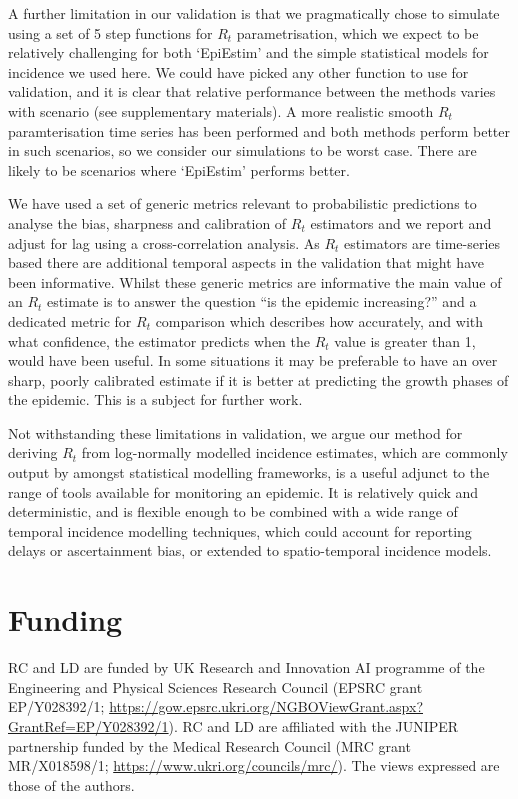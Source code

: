 \documentclass[10pt,letterpaper]{article}
\begin{document}
A further limitation in our validation is that we pragmatically chose to simulate using a set of 5 step functions for $R_t$ parametrisation, which we expect to be relatively challenging for both `EpiEstim' and the simple statistical models for incidence we used here. We could have picked any other function to use for validation, and it is clear that relative performance between the methods varies with scenario (see supplementary materials). A more realistic smooth $R_t$ paramterisation time series has been performed and both methods perform better in such scenarios, so we consider our simulations to be worst case. There are likely to be scenarios where `EpiEstim' performs better.

We have used a set of generic metrics relevant to probabilistic predictions to analyse the bias, sharpness and calibration of $R_t$ estimators and we report and adjust for lag using a cross-correlation analysis. As $R_t$ estimators are time-series based there are additional temporal aspects in the validation that might have been informative. Whilst these generic metrics are informative the main value of an $R_t$ estimate is to answer the question ``is the epidemic increasing?'' and a dedicated metric for $R_t$ comparison which describes how accurately, and with what confidence, the estimator predicts when the $R_t$ value is greater than 1, would have been useful. In some situations it may be preferable to have an over sharp, poorly calibrated estimate if it is better at predicting the growth phases of the epidemic. This is a subject for further work.

Not withstanding these limitations in validation, we argue our method for deriving $R_t$ from log-normally modelled incidence estimates, which are commonly output by amongst statistical modelling frameworks, is a useful adjunct to the range of tools available for monitoring an epidemic. It is relatively quick and deterministic, and is flexible enough to be combined with a wide range of temporal incidence modelling techniques, which could account for reporting delays or ascertainment bias, or extended to spatio-temporal incidence models.

\nolinenumbers



\section*{Funding}

RC and LD are funded by UK Research and Innovation AI programme of the Engineering and Physical Sciences Research Council (EPSRC grant EP/Y028392/1;  \url{https://gow.epsrc.ukri.org/NGBOViewGrant.aspx?GrantRef=EP/Y028392/1}). RC and LD are affiliated with the JUNIPER partnership funded by the Medical Research Council (MRC grant MR/X018598/1; \url{https://www.ukri.org/councils/mrc/}). The views expressed are those of the authors.
\end{document}
